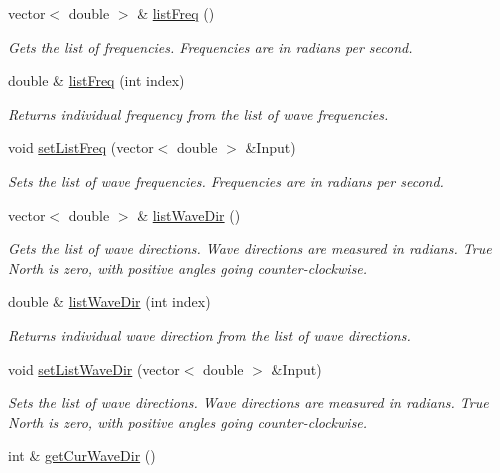 \begin{DoxyCompactItemize}
vector$<$ double $>$ \& \hyperlink{class_output_derived_aeca7e08a1c561ae61a7a97a59b05cbdf}{list\-Freq} ()
\begin{DoxyCompactList}\small\item\em Gets the list of frequencies. Frequencies are in radians per second. \end{DoxyCompactList}\item 
double \& \hyperlink{class_output_derived_ae630f20aca768c789851b82020e2a8c3}{list\-Freq} (int index)
\begin{DoxyCompactList}\small\item\em Returns individual frequency from the list of wave frequencies. \end{DoxyCompactList}\item 
void \hyperlink{class_output_derived_a40c5ed80faa1c509be5348c9765a756a}{set\-List\-Freq} (vector$<$ double $>$ \&Input)
\begin{DoxyCompactList}\small\item\em Sets the list of wave frequencies. Frequencies are in radians per second. \end{DoxyCompactList}\item 
vector$<$ double $>$ \& \hyperlink{class_output_derived_a114e057d84f34e5138d077fd7f053898}{list\-Wave\-Dir} ()
\begin{DoxyCompactList}\small\item\em Gets the list of wave directions. Wave directions are measured in radians. True North is zero, with positive angles going counter-\/clockwise. \end{DoxyCompactList}\item 
double \& \hyperlink{class_output_derived_a043a3621ac94b69cd16170a550bb3905}{list\-Wave\-Dir} (int index)
\begin{DoxyCompactList}\small\item\em Returns individual wave direction from the list of wave directions. \end{DoxyCompactList}\item 
void \hyperlink{class_output_derived_a4c6c59f99a371d7cae9a4930ef1cd094}{set\-List\-Wave\-Dir} (vector$<$ double $>$ \&Input)
\begin{DoxyCompactList}\small\item\em Sets the list of wave directions. Wave directions are measured in radians. True North is zero, with positive angles going counter-\/clockwise. \end{DoxyCompactList}\item 
int \& \hyperlink{class_output_derived_ad59fff8dc8f1772039aff4950a3cdf18}{get\-Cur\-Wave\-Dir} ()

\end{DoxyCompactItemize}
